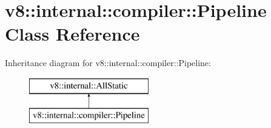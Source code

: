\hypertarget{classv8_1_1internal_1_1compiler_1_1_pipeline}{}\section{v8\+:\+:internal\+:\+:compiler\+:\+:Pipeline Class Reference}
\label{classv8_1_1internal_1_1compiler_1_1_pipeline}
Inheritance diagram for v8\+:\+:internal\+:\+:compiler\+:\+:Pipeline\+:\begin{figure}[H]
\begin{center}
\leavevmode
\includegraphics[height=2.000000cm]{classv8_1_1internal_1_1compiler_1_1_pipeline}
\end{center}
\end{figure}
